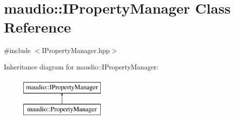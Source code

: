 \hypertarget{classmaudio_1_1IPropertyManager}{\section{maudio\-:\-:I\-Property\-Manager Class Reference}
\label{classmaudio_1_1IPropertyManager}
}


{\ttfamily \#include $<$I\-Property\-Manager.\-hpp$>$}

Inheritance diagram for maudio\-:\-:I\-Property\-Manager\-:\begin{figure}[H]
\begin{center}
\leavevmode
\includegraphics[height=2.000000cm]{classmaudio_1_1IPropertyManager}
\end{center}
\end{figure}
